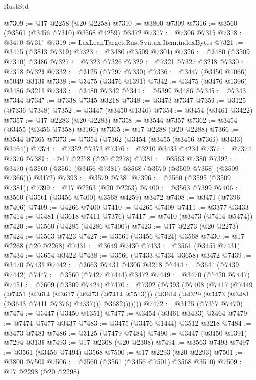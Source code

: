 \begin{lexlean}{RustStd}
\begin{coremodule}
{\begin{coremodule}
{{{{{{{{{{{{{{{{{{{{{{{{{{{{{{{{{{{{{{{{{{{{{@7309 := @17 @2258 (@20 @2258)
@7310 := @3800 @7309
@7316 := @3560 (@3561 (@3456 @7310) @3568 @4259) @3472
@7317 := @7306 @7316
@7318 := @3470 @7317
@7319 := LexLeanTarget.RustSyntax.Item.indexBytes
@7321 := @3475 (@3813 @7319)
@7323 := @3480 (@3509 @7301)
@7326 := @3480 (@3509 @7310) @3486
@7327 := @7323 @7326
@7329 := @7321 @7327 @3218
@7330 := @7318 @7329
@7332 := @3125 (@7297 @7330)
@7336 := @3447 (@3450 @1066) @5049 @3136
@7338 := @3475 (@3476 @1391)
@7342 := @3475 (@3476 @1396) @3486 @3218
@7343 := @3480 @7342
@7344 := @5399 @3486
@7345 := @7343 @7344
@7347 := @7338 @7345 @3218
@7348 := @3473 @7347
@7350 := @3125 (@7336 @7348)
@7352 := @3447 (@3450 @1346)
@7354 := @3454 (@3461 @3422)
@7357 := @17 @2283 (@20 @2283)
@7358 := @3544 @7357
@7362 := @3454 (@3455 (@3456 @7358) @3166)
@7365 := @17 @2288 (@20 @2288)
@7366 := @3544 @7365
@7373 := @7354 (@7362 (@3454 (@3455 (@3456 @7366) @3433) @3464))
@7374 := @7352 @7373
@7376 := @3210 @3433 @4234
@7377 := @7374 @7376
@7380 := @17 @2278 (@20 @2278)
@7381 := @3563 @7380
@7392 := @3470 (@3560 (@3561 (@3456 @7381) @3568 (@3570 (@3509 @7358) (@3509 @7366))) @3472)
@7393 := @3579 @7381
@7396 := @3560 (@3595 (@3509 @7381))
@7399 := @17 @2263 (@20 @2263)
@7400 := @3563 @7399
@7406 := @3560 (@3561 (@3456 @7400) @3568 @4259) @3472
@7408 := @3470 (@7396 @7406)
@7409 := @4266 @7400
@7410 := @4265 @7409
@7411 := @3377 @3433
@7414 := @3481 (@3618 @7411 @7376)
@7417 := @7410 (@3473 (@7414 @5474))
@7420 := @3560 (@4285 (@4286 @7400))
@7423 := @17 @2273 (@20 @2273)
@7424 := @3563 @7423
@7427 := @3561 (@3456 @7424) @3568
@7430 := @17 @2268 (@20 @2268)
@7431 := @3649 @7430
@7433 := @3561 (@3456 @7431)
@7434 := @3654 @3422
@7438 := @3560 (@7433 @7434 @3658) @3472
@7439 := @3470 @7438
@7442 := @3663 @7431 @4306 @3218
@7444 := @3647 (@7439 @7442)
@7447 := @3560 (@7427 @7444) @3472
@7449 := @3470 (@7420 @7447)
@7451 := @3609 (@3509 @7424)
@7470 := @7392
    (@7393
      (@7408
        (@7417
          (@7449
            (@7451
              (@3614
                (@3617 (@3473 (@7414 @5513)))
                (@3614 (@4329 (@3473 (@3481 (@3643 @7411 @7376) @4337))) @3682)))))))
@7472 := @3125 (@7377 @7470)
@7474 := @3447 (@3450 @1351)
@7477 := @3454 (@3461 @3433) @3464
@7479 := @7474 @7477 @3437
@7483 := @3475 (@3476 @1444) @3512 @3218
@7484 := @3473 @7483
@7486 := @3125 (@7479 @7484)
@7490 := @3447 (@3450 @1391) @7294 @3136
@7493 := @17 @2308 (@20 @2308)
@7494 := @3563 @7493
@7497 := @3561 (@3456 @7494) @3568
@7500 := @17 @2293 (@20 @2293)
@7501 := @3800 @7500
@7506 := @3560 (@3561 (@3456 @7501) @3568 @3510)
@7509 := @17 @2298 (@20 @2298)
}}}}}}}}}}}}}}}}}}}}}}}}}}}}}}}}}}}}}}}}}}}}}
\end{coremodule}}
\end{coremodule}
\end{lexlean}
